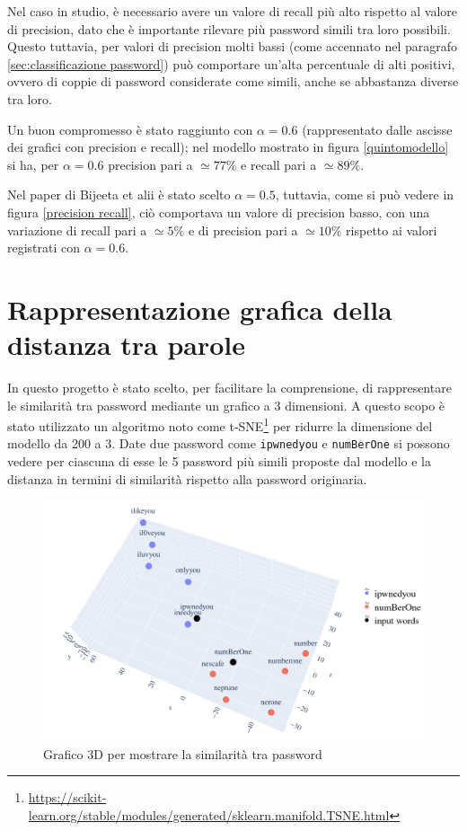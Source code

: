 Nel caso in studio, è necessario avere un valore di recall più alto rispetto al valore di precision, dato che è importante rilevare più password simili tra loro possibili. Questo tuttavia, per valori di precision molti bassi (come accennato nel paragrafo \ref{sec:classificazione password}) può comportare un'alta percentuale di alti positivi, ovvero di coppie di password considerate come simili, anche se abbastanza diverse tra loro.

Un buon compromesso è stato raggiunto con $\alpha = 0.6$ (rappresentato dalle ascisse dei grafici con precision e recall); nel modello mostrato in figura \ref{quintomodello} si ha, per $\alpha = 0.6$ precision pari a $\simeq 77\%$ e recall pari a $\simeq 89\%$.

Nel paper di Bijeeta et alii \cite{bijeeta} è stato scelto $\alpha = 0.5$, tuttavia, come si può vedere in figura \ref{precision recall}, ciò comportava un valore di precision basso, con una variazione di recall pari a $\simeq 5\%$ e di precision pari a $\simeq 10\%$ rispetto ai valori registrati con $\alpha = 0.6$.
\section{Rappresentazione grafica della distanza tra parole}
\label{sec:rappresentazione grafica distanza tra parole}
In questo progetto è stato scelto, per facilitare la comprensione, di rappresentare le similarità tra password mediante un grafico a 3 dimensioni. A questo scopo è stato utilizzato un algoritmo noto come t-SNE\footnote{\url{https://scikit-learn.org/stable/modules/generated/sklearn.manifold.TSNE.html}} per ridurre la dimensione del modello da 200 a 3.
Date due password come \texttt{ipwnedyou} e \texttt{numBerOne} si possono vedere per ciascuna di esse le 5 password più simili proposte dal modello e la distanza in termini di similarità rispetto alla password originaria.
\begin{figure}[H]
    \centering
    \includegraphics[width=15cm]{./immagini/3dplot.png}
    \caption{Grafico 3D per mostrare la similarità tra password}
    \label{3d}
\end{figure}